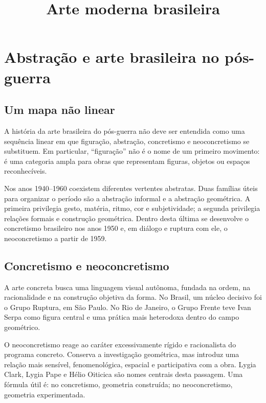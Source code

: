 



\title{Arte moderna brasileira}
\maketitle

\label{section-phantom}

\tableofcontents

\section{Abstração e arte brasileira no pós-guerra}
\label{section-abstracao-pos-guerra}

\subsection{Um mapa não linear}
\label{subsection-mapa-nao-linear}

A história da arte brasileira do pós-guerra não deve ser entendida como uma
sequência linear em que figuração, abstração, concretismo e neoconcretismo se
substituem. Em particular, ``figuração'' não é o nome de um primeiro movimento:
é uma categoria ampla para obras que representam figuras, objetos ou espaços
reconhecíveis.

Nos anos 1940--1960 coexistem diferentes vertentes abstratas. Duas famílias
úteis para organizar o período são a abstração informal e a abstração
geométrica. A primeira privilegia gesto, matéria, ritmo, cor e subjetividade; a
segunda privilegia relações formais e construção geométrica. Dentro desta
última se desenvolve o concretismo brasileiro nos anos 1950 e, em diálogo e
ruptura com ele, o neoconcretismo a partir de 1959.

\subsection{Concretismo e neoconcretismo}
\label{subsection-concretismo-neoconcretismo}

A arte concreta busca uma linguagem visual autônoma, fundada na ordem, na
racionalidade e na construção objetiva da forma. No Brasil, um núcleo decisivo
foi o Grupo Ruptura, em São Paulo. No Rio de Janeiro, o Grupo Frente teve Ivan
Serpa como figura central e uma prática mais heterodoxa dentro do campo
geométrico.

O neoconcretismo reage ao caráter excessivamente rígido e racionalista do
programa concreto. Conserva a investigação geométrica, mas introduz uma relação
mais sensível, fenomenológica, espacial e participativa com a obra. Lygia
Clark, Lygia Pape e Hélio Oiticica são nomes centrais desta passagem. Uma
fórmula útil é: no concretismo, geometria construída; no neoconcretismo,
geometria experimentada.

